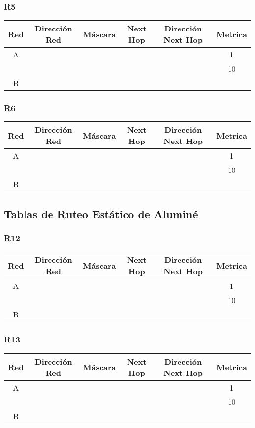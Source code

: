 \documentclass[12pt,a4paper,spanish]{article}
\begin{document}
\subsubsection{R5}
\begin{tabular}{|c|c|c|c|c|c|}
	\hline
	Red & Dirección Red & Máscara & Next Hop & Dirección Next Hop & Metrica \\
	\hline
	\hline
	A &  &  &  &  & 1\\
 	  &  &  &  &  & 10 \\
	\hline	
	B & & & & &\\
	\hline
\end{tabular}

\subsubsection{R6}
\begin{tabular}{|c|c|c|c|c|c|}
	\hline
	Red & Dirección Red & Máscara & Next Hop & Dirección Next Hop & Metrica \\
	\hline
	\hline
	A &  &  &  &  & 1\\
 	  &  &  &  &  & 10 \\
	\hline	
	B & & & & &\\
	\hline
\end{tabular}


\subsection{Tablas de Ruteo Estático de Aluminé}

\subsubsection{R12}
\begin{tabular}{|c|c|c|c|c|c|}
	\hline
	Red & Dirección Red & Máscara & Next Hop & Dirección Next Hop & Metrica \\
	\hline
	\hline
	A &  &  &  &  & 1\\
 	  &  &  &  &  & 10 \\
	\hline	
	B & & & & &\\
\end{tabular}

\subsubsection{R13}
\begin{tabular}{|c|c|c|c|c|c|}
	\hline
	Red & Dirección Red & Máscara & Next Hop & Dirección Next Hop & Metrica \\
	\hline
	\hline
	A &  &  &  &  & 1\\
 	  &  &  &  &  & 10 \\
	\hline	
	B & & & & &\\
	\hline
\end{tabular}
\end{document}
